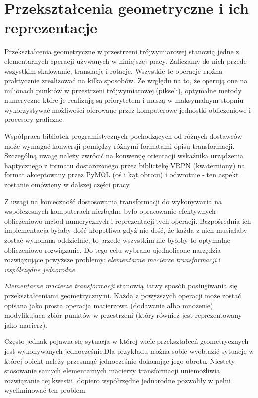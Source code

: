 \documentclass[licencjacka]{pracamgr}
\begin{document}
\section{Przekształcenia geometryczne i ich reprezentacje}
Przekształcenia geometryczne w przestrzeni trójwymiarowej stanowią jedne z elementarnych operacji używanych w niniejszej pracy. Zaliczamy do nich przede wszystkim skalowanie, translacje i rotacje. Wszystkie te operacje można praktycznie zrealizować na kilka sposobów. Ze względu na to, że operują one na milionach punktów w przestrzeni trójwymiarowej (pikseli), optymalne metody numeryczne które je realizują są priorytetem i muszą w maksymalnym stopniu wykorzystywać możliwości oferowane przez komputerowe jednostki obliczeniowe i procesory graficzne. 

Współpraca bibliotek programistycznych pochodzących od różnych dostawców może wymagać konwersji pomiędzy różnymi formatami opisu transformacji. Szczególną uwagę należy zwrócić na konwersję orientacji wskaźnika urządzenia haptycznego z formatu dostarczonego przez bibliotekę VRPN (kwaterniony) na format akceptowany przez PyMOL (oś i kąt obrotu) i odwrotnie - ten aspekt zostanie omówiony w dalszej części pracy.

Z uwagi na konieczność dostosowania transformacji do wykonywania na współczesnych komputerach niezbędne było opracowanie efektywnych obliczeniowo metod numerycznych i reprezentacji tych operacji. Bezpośrednia ich implementacja byłaby dość kłopotliwa gdyż nie dość, że każda z nich musiałaby zostać wykonana oddzielnie, to przede wszystkim nie byłoby to optymalne obliczeniowo rozwiązanie. Do tego celu wybrano ujednolicone narzędzia rozwiązujące powyższe problemy: \textit{elementarne macierze transformacji} i \textit{współrzędne jednorodne}.

\textit{Elementarne macierze transformacji} stanowią łatwy sposób posługiwania się przekształceniami geometrycznymi. Każda z powyższych operacji może zostać opisana jako prosta operacja macierzowa (dodawanie albo mnożenie) modyfikująca zbiór punktów w przestrzeni (który również jest reprezentowany jako macierz). %


Często jednak pojawia się sytuacja w której wiele przekształceń geometrycznych jest wykonywanych jednocześnie.Dla przykładu można sobie wyobrazić sytuację w której obiekt należy przesunąć jednocześnie dokonując jego obrotu. Niestety stosowanie samych elementarnych macierzy transformacji uniemożliwia rozwiązanie tej kwestii, dopiero współrzędne jednorodne pozwoliły w pełni wyeliminować ten problem.
\end{document}
